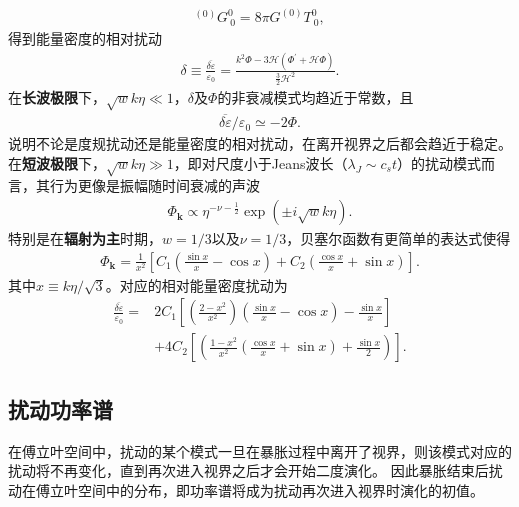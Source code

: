 \begin{align}
  ^{(0)}G^{0}_{~0} =8\pi G ^{(0)}T^{0}_{~0}, 
\end{align}
得到能量密度的相对扰动
\begin{align}
  \label{eq:gauge-invariant-relative-energy-density-perturbation}
  \delta\equiv\frac{\overline{\delta\varepsilon}}{\varepsilon_0}
  =\frac{k^2 \Phi -3\mathcal{H}{\left(\Phi^\prime+\mathcal{H}\Phi\right)}}{\frac{3}{2}\mathcal{H}^2}.
\end{align}
在\textbf{长波极限}下，$\sqrt{w}k\eta\ll
1$，$\delta$及$\Phi$的非衰减模式均趋近于常数，且
\begin{align}
  \overline{\delta\varepsilon} /\varepsilon_0\simeq -2\Phi.
\end{align}
说明不论是度规扰动还是能量密度的相对扰动，在离开视界之后都会趋近于稳定。\\
在\textbf{短波极限}下，$\sqrt{w}k\eta\gg 1$，即对尺度小于Jeans波长（$\lambda_{J}\sim
c_{s}t$）的扰动模式而言，其行为更像是振幅随时间衰减的声波
\begin{align}
  \Phi_{\mathbf{k}}\propto \eta^{-\nu-\frac{1}{2}}\exp{\left(\pm
  i\sqrt{w}k\eta\right)}. 
\end{align}
特别是在\textbf{辐射为主}时期，$w=1 /3$以及$\nu=1
/3$，贝塞尔函数有更简单的表达式使得
\begin{align}
  \label{eq:Phi-in-radiation-dominated}
  \Phi_{\mathbf{k}}=\frac{1}{x^2}{\left[
  C_1{\left(\frac{\sin x}{x}-\cos x\right)}+
  C_2{\left(\frac{\cos x}{x}+\sin x\right)}\right]}.
\end{align}
其中$x\equiv k\eta /\sqrt{3}$。对应的相对能量密度扰动为
\begin{align}
  \frac{\overline{\delta\varepsilon}}{\varepsilon_0}=
  &2C_1{\left[{\left(\frac{2-x^2}{x^2}\right)}{\left(\frac{\sin x}{x}-\cos x\right)}-\frac{\sin x}{x}\right]}
  \\
  &+4C_2{\left[{\left(\frac{1-x^2}{x^2}{\left(\frac{\cos x}{x}+\sin x\right)}+\frac{\sin x}{2}\right)}\right]}.
\end{align}

\subsection{扰动功率谱}
在傅立叶空间中，扰动的某个模式一旦在暴胀过程中离开了视界，则该模式对应的扰动将不再变化，直到再次进入视界之后才会开始二度演化。
因此暴胀结束后扰动在傅立叶空间中的分布，即功率谱将成为扰动再次进入视界时演化的初值。

